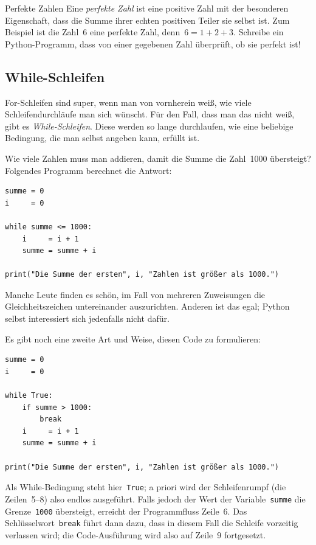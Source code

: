 \documentclass{blatt}
\begin{document}
\begin{aufgabe}{Perfekte Zahlen}
Eine \emph{perfekte Zahl} ist eine positive Zahl mit der besonderen
Eigenschaft, dass die Summe ihrer echten positiven Teiler sie selbst ist. Zum
Beispiel ist die Zahl~$6$ eine perfekte Zahl, denn~$6 = 1 + 2 + 3$.
Schreibe ein Python-Programm, dass von einer gegebenen Zahl überprüft, ob sie
perfekt ist!
\end{aufgabe}


\subsection{While-Schleifen}

For-Schleifen sind super, wenn man von vornherein weiß, wie viele
Schleifendurchläufe man sich wünscht. Für den Fall, dass man das nicht weiß,
gibt es \emph{While-Schleifen}. Diese werden so lange durchlaufen, wie eine
beliebige Bedingung, die man selbst angeben kann, erfüllt ist.

Wie viele Zahlen muss man addieren, damit die Summe die Zahl~1000 übersteigt?
Folgendes Programm berechnet die Antwort:
\begin{verbatim}
summe = 0
i     = 0

while summe <= 1000:
    i     = i + 1
    summe = summe + i

print("Die Summe der ersten", i, "Zahlen ist größer als 1000.")
\end{verbatim}
Manche Leute finden es schön, im Fall von mehreren Zuweisungen die
Gleichheitszeichen untereinander auszurichten. Anderen ist das egal; Python
selbst interessiert sich jedenfalls nicht dafür.

Es gibt noch eine zweite Art und Weise, diesen Code zu formulieren:
\begin{verbatim}
summe = 0
i     = 0

while True:
    if summe > 1000:
        break
    i     = i + 1
    summe = summe + i

print("Die Summe der ersten", i, "Zahlen ist größer als 1000.")
\end{verbatim}
Als While-Bedingung steht hier~\texttt{True}; a priori wird der
Schleifenrumpf (die Zeilen~5--8) also endlos ausgeführt. Falls jedoch der Wert
der Variable~\texttt{summe} die Grenze~\texttt{1000}
übersteigt, erreicht der Programmfluss Zeile~6. Das
Schlüsselwort~\texttt{break} führt dann dazu, dass in diesem Fall die
Schleife vorzeitig verlassen wird; die Code-Ausführung wird also auf Zeile~9
fortgesetzt.
\end{document}
